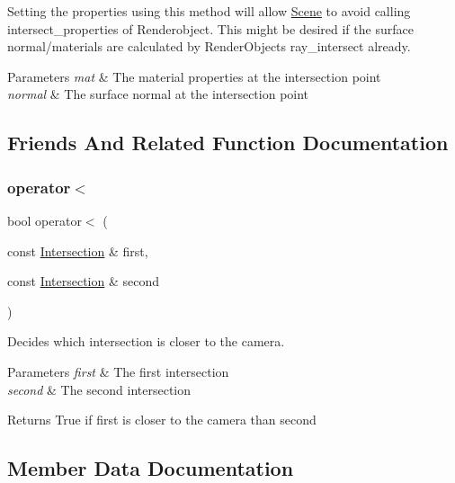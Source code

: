 Setting the properties using this method will allow \mbox{\hyperlink{classScene}{Scene}} to avoid calling intersect\+\_\+properties of Renderobject. This might be desired if the surface normal/materials are calculated by Render\+Objects ray\+\_\+intersect already. 
\begin{DoxyParams}{Parameters}
{\em mat} & The material properties at the intersection point \\
\hline
{\em normal} & The surface normal at the intersection point \\
\hline
\end{DoxyParams}


\subsection{Friends And Related Function Documentation}
\mbox{\label{classIntersection_a955ab59fdb5154881d491eebc653250f}} 
\subsubsection{\texorpdfstring{operator$<$}{operator<}}
{\footnotesize\ttfamily bool operator$<$ (\begin{DoxyParamCaption}\item[{const \mbox{\hyperlink{classIntersection}{Intersection}} \&}]{first,  }\item[{const \mbox{\hyperlink{classIntersection}{Intersection}} \&}]{second }\end{DoxyParamCaption})\hspace{0.3cm}{\ttfamily [friend]}}



Decides which intersection is closer to the camera. 


\begin{DoxyParams}{Parameters}
{\em first} & The first intersection \\
\hline
{\em second} & The second intersection \\
\hline
\end{DoxyParams}
\begin{DoxyReturn}{Returns}
True if first is closer to the camera than second 
\end{DoxyReturn}


\subsection{Member Data Documentation}
\mbox{\label{classIntersection_a65da854f067b6f08175a97d262a17f1e}} 

